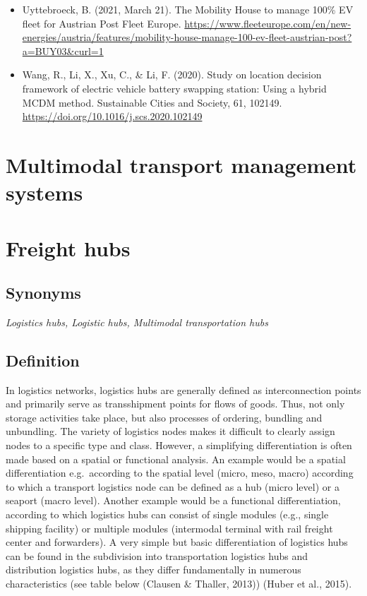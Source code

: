 \documentclass[
]{book}
\begin{document}
\begin{itemize}
\item
  Uyttebroeck, B. (2021, March 21). The Mobility House to manage 100\% EV fleet for Austrian Post \textbar{} Fleet Europe. \url{https://www.fleeteurope.com/en/new-energies/austria/features/mobility-house-manage-100-ev-fleet-austrian-post?a=BUY03\&curl=1}
\item
  Wang, R., Li, X., Xu, C., \& Li, F. (2020). Study on location decision framework of electric vehicle battery swapping station: Using a hybrid MCDM method. Sustainable Cities and Society, 61, 102149. \url{https://doi.org/10.1016/j.scs.2020.102149}
\end{itemize}

\hypertarget{mtms}{%
\section{Multimodal transport management systems}\label{mtms}}

\hypertarget{freight_hubs}{%
\section{Freight hubs}\label{freight_hubs}}

\hypertarget{synonyms-32}{%
\subsection*{Synonyms}\label{synonyms-32}}

\emph{Logistics hubs, Logistic hubs, Multimodal transportation hubs}

\hypertarget{definition-35}{%
\subsection*{Definition}\label{definition-35}}

In logistics networks, logistics hubs are generally defined as interconnection points and primarily serve as transshipment points for flows of goods. Thus, not only storage activities take place, but also processes of ordering, bundling and unbundling. The variety of logistics nodes makes it difficult to clearly assign nodes to a specific type and class. However, a simplifying differentiation is often made based on a spatial or functional analysis. An example would be a spatial differentiation e.g.~according to the spatial level (micro, meso, macro) according to which a transport logistics node can be defined as a hub (micro level) or a seaport (macro level). Another example would be a functional differentiation, according to which logistics hubs can consist of single modules (e.g., single shipping facility) or multiple modules (intermodal terminal with rail freight center and forwarders). A very simple but basic differentiation of logistics hubs can be found in the subdivision into transportation logistics hubs and distribution logistics hubs, as they differ fundamentally in numerous characteristics (see table below (Clausen \& Thaller, 2013)) (Huber et al., 2015).
\end{document}
